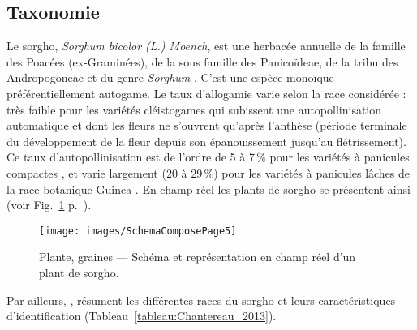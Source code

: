 \documentclass[a4paper,11pt]{article}
\begin{document}
\subsection{Taxonomie}

Le sorgho, \emph{Sorghum bicolor (L.) Moench}, est une herbacée
annuelle de la famille des Poacées (ex-Graminées), de la sous famille
des Panicoïdeae, de la tribu des Andropogoneae et du genre
\emph{Sorghum} \cite{Doggett_1988}. C'est une espèce monoïque
préférentiellement autogame. Le taux d'allogamie varie selon la race
considérée : très faible pour les variétés cléistogames qui subissent
une autopollinisation automatique et dont les fleurs ne s'ouvrent
qu'après l'anthèse (période terminale du développement de la fleur
depuis son épanouissement jusqu'au flétrissement). Ce taux
d'autopollinisation est de l'ordre de 5 à 7\,\% pour les variétés à
panicules compactes \cite{Doggett_1988}, et varie largement (20 à
29\,\%) pour les variétés à panicules lâches de la race botanique
Guinea \cite{Ollitrault_1987,Chantereau_1994}. En champ réel les
plants de sorgho se présentent ainsi (voir
Fig.~\ref{fig-SchemaComposePage5}
p.~\pageref{fig-SchemaComposePage5}).

\begin{figure}
  \begin{center}
    \texttt{[image: images/SchemaComposePage5]}
  \end{center}
  \caption{Plante, graines --- Schéma et représentation en champ réel d'un plant de sorgho.}
  \label{fig-SchemaComposePage5}
\end{figure}

Par ailleurs, , résument les différentes
races du sorgho et leurs caractéristiques d'identification
(Tableau~\ref{tableau:Chantereau_2013}).
\end{document}
